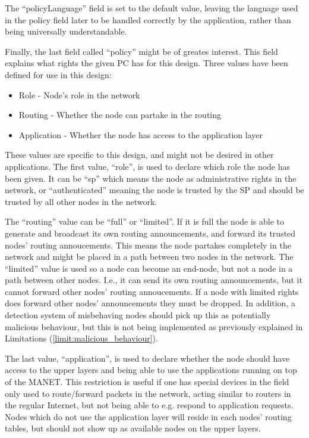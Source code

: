 The ``policyLanguage'' field is set to the default value, leaving the
language used in the policy field later to be handled correctly by the
application, rather than being universally understandable.

Finally, the last field called ``policy'' might be of greates interest. This
field explains what rights the given \ac{PC} has for this design. Three values
have been defined for use in this design:

\begin{itemize}
  \item Role - Node's role in the network
  \item Routing - Whether the node can partake in the routing
  \item Application - Whether the node has access to the application layer
\end{itemize}

These values are specific to this design, and might not be desired in
other applications. The first value, ``role'', is used to declare which role the
node has been given. It can be ``sp'' which means the node as administrative
rights in the network, or ``authenticated'' meaning the node is trusted by the
\ac{SP} and should be trusted by all other nodes in the network.

The ``routing'' value can be ``full'' or ``limited''. If it is full the node is
able to generate and broadcast its own routing announcements, and forward its
trusted nodes' routing annoucements. This means the node partakes completely in
the network and might be placed in a path between two nodes in the network. The
``limited'' value is used so a node can become an end-node, but not a node in a
path between other nodes. I.e., it can send its own routing announcements, but
it cannot forward other nodes' routing annoucements. If a node with limited
rights does forward other nodes' announcements they must be dropped. In
addition, a detection system of misbehaving nodes should pick up this as
potentially malicious behaviour, but this is not being implemented as
previously explained in Limitations (\ref{limit:malicious_behaviour}).

The last value, ``application'', is used to declare whether the node should have
access to the upper layers and being able to use the applications running on top
of the \ac{MANET}. This restriction is useful if one has special devices in the
field only used to route/forward packets in the network, acting similar to
routers in the regular Internet, but not being able to e.g. respond to
application requests. Nodes which do not use the application layer will reside
in each nodes' routing tables, but should not show up as available nodes on the
upper layers.

